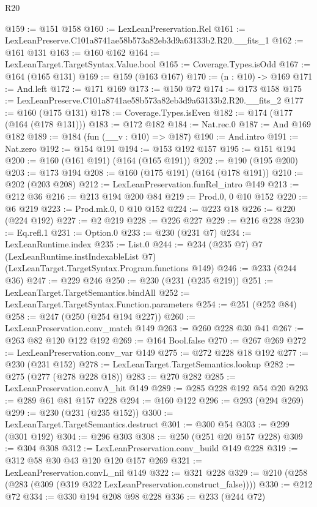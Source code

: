 \begin{lexlean}{R20}
\begin{coremodule}
@159 := @151 @158
@160 := LexLeanPreservation.Rel
@161 := LexLeanPreserve.C101a8741ae58b573a82eb3d9a63133b2.R20.__fits_1
@162 := @161 @131
@163 := @160 @162
@164 := LexLeanTarget.TargetSyntax.Value.bool
@165 := Coverage.Types.isOdd
@167 := @164 (@165 @131)
@169 := @159 (@163 @167)
@170 := (n : @10) -> @169
@171 := And.left
@172 := @171 @169
@173 := @150 @72
@174 := @173 @158
@175 := LexLeanPreserve.C101a8741ae58b573a82eb3d9a63133b2.R20.__fits_2
@177 := @160 (@175 @131)
@178 := Coverage.Types.isEven
@182 := @174 (@177 (@164 (@178 @131)))
@183 := @172 @182
@184 := Nat.rec.{0}
@187 := And @169 @182
@189 := @184 (fun (__v : @10) => @187)
@190 := And.intro
@191 := Nat.zero
@192 := @154 @191
@194 := @153 @192 @157
@195 := @151 @194
@200 := @160 (@161 @191) (@164 (@165 @191))
@202 := @190 (@195 @200)
@203 := @173 @194
@208 := @160 (@175 @191) (@164 (@178 @191))
@210 := @202 (@203 @208)
@212 := LexLeanPreservation.funRel_intro @149
@213 := @212 @36
@216 := @213 @194 @200 @84
@219 := Prod.{0, 0} @10 @152
@220 := @6 @219
@223 := Prod.mk.{0, 0} @10 @152
@224 := @223 @18
@226 := @220 (@224 @192)
@227 := @2 @219
@228 := @226 @227
@229 := @216 @228
@230 := Eq.refl.{1}
@231 := Option.{0}
@233 := @230 (@231 @7)
@234 := LexLeanRuntime.index
@235 := List.{0}
@244 := @234
    (@235 @7)
    @7
    (LexLeanRuntime.instIndexableList @7)
    (LexLeanTarget.TargetSyntax.Program.functions @149)
@246 := @233 (@244 @36)
@247 := @229 @246
@250 := @230 (@231 (@235 @219))
@251 := LexLeanTarget.TargetSemantics.bindAll
@252 := LexLeanTarget.TargetSyntax.Function.parameters
@254 := @251 (@252 @84)
@258 := @247 (@250 (@254 @194 @227))
@260 := LexLeanPreservation.conv_match @149
@263 := @260 @228 @30 @41
@267 := @263 @82 @120 @122 @192
@269 := @164 Bool.false
@270 := @267 @269
@272 := LexLeanPreservation.conv_var @149
@275 := @272 @228 @18 @192
@277 := @230 (@231 @152)
@278 := LexLeanTarget.TargetSemantics.lookup
@282 := @275 (@277 (@278 @228 @18))
@283 := @270 @282
@285 := LexLeanPreservation.convA_hit @149
@289 := @285 @228 @192 @54 @20
@293 := @289 @61 @81 @157 @228
@294 := @160 @122
@296 := @293 (@294 @269)
@299 := @230 (@231 (@235 @152))
@300 := LexLeanTarget.TargetSemantics.destruct
@301 := @300 @54
@303 := @299 (@301 @192)
@304 := @296 @303
@308 := @250 (@251 @20 @157 @228)
@309 := @304 @308
@312 := LexLeanPreservation.conv_build @149 @228
@319 := @312 @58 @30 @43 @120 @120 @157 @269
@321 := LexLeanPreservation.convL_nil @149
@322 := @321 @228
@329 := @210 (@258 (@283 (@309 (@319 @322 LexLeanPreservation.construct_false))))
@330 := @212 @72
@334 := @330 @194 @208 @98 @228
@336 := @233 (@244 @72)

\end{coremodule}
\end{lexlean}

